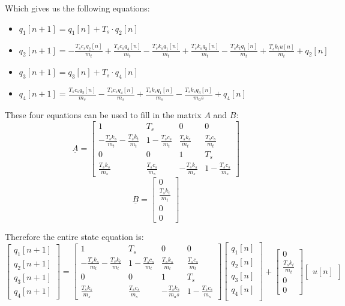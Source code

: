 \documentclass[11pt]{article}
\begin{document}
Which gives us the following equations:
\begin{itemize}
\item \(q_1[n+1]=q_1[n]+T_s\cdot q_2[n]\)
\item \(q_2[n+1]=-\frac{T_s c_s q_2[n]}{m_t} + \frac{T_s c_s q_4[n]}{m_t} - \frac{T_s k_s q_1[n]}{m_t} + \frac{T_s k_s q_3[n]}{m_t} - \frac{T_s k_t q_1[n]}{m_t} + \frac{T_s k_t u[n]}{m_t} + q_2[n]\)
\item \(q_3[n+1]=q_3[n]+T_s\cdot q_4[n]\)
\item \(q_4[n+1]=\frac{T_s c_s q_2[n]}{m_s} - \frac{T_s c_s q_4[n]}{m_s} + \frac{T_s k_s q_1[n]}{m_s} - \frac{T_s k_s q_3[n]}{m_as} + q_4[n]\)
\end{itemize}
These four equations can be used to fill in the matrix \(A\) and \(B\):
\[\underline{A} = \begin{bmatrix}
1 & T_s & 0 & 0 \\
-\frac{T_s k_s }{m_t} - \frac{T_s k_t }{m_t} & 1 - \frac{T_s c_s }{m_t} & \frac{T_s k_s }{m_t} & \frac{T_s c_s }{m_t} \\
0 & 0 & 1 & T_s \\
\frac{T_s k_s }{m_s} & \frac{T_s c_s }{m_s} &  -\frac{T_s k_s }{m_s} & 1 - \frac{T_s c_s }{m_s}
\end{bmatrix}\]
\[\underline{B} = \begin{bmatrix}
0 \\
\frac{T_s k_t}{m_t} \\
0 \\
0
\end{bmatrix}\]

Therefore the entire state equation is:
\[\begin{bmatrix}
q_1[n+1] \\
q_2[n+1] \\
q_3[n+1] \\
q_4[n+1]
\end{bmatrix} = \begin{bmatrix}
1 & T_s & 0 & 0 \\
-\frac{T_s k_s }{m_t} - \frac{T_s k_t }{m_t} & 1 - \frac{T_s c_s }{m_t} & \frac{T_s k_s }{m_t} & \frac{T_s c_s }{m_t} \\
0 & 0 & 1 & T_s \\
\frac{T_s k_s }{m_s} & \frac{T_s c_s }{m_s} &  -\frac{T_s k_s }{m_as} & 1 - \frac{T_s c_s }{m_s}
\end{bmatrix} \begin{bmatrix}
q_1[n] \\
q_2[n] \\
q_3[n] \\
q_4[n] \\
\end{bmatrix} + \begin{bmatrix}
0 \\
\frac{T_s k_t}{m_t} \\
0 \\
0
\end{bmatrix} \begin{bmatrix}
u[n]
\end{bmatrix}\]
\end{document}
